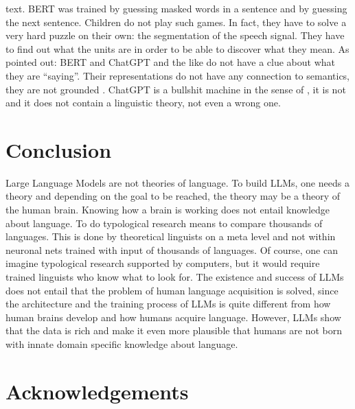 text. BERT was trained by guessing masked words in a sentence and by guessing the next
sentence. Children do not play such games. In fact, they have to solve a very hard puzzle on their own:
the segmentation of the speech signal. They have to find out what the units are in order to be able
to discover what they mean. 
%
As \citet{BK2020a} pointed
out: BERT and ChatGPT and the like do not have a clue about what they are ``saying''. Their representations do not have any
connection to semantics, they are not grounded \citep{BeulsVanEcke2024a}. ChatGPT is a bullshit machine in the sense of
\citet{HicksHumphriesSlater2024a}, it is not and it does not contain a linguistic theory, not even a
wrong one.
%


\section{Conclusion}

Large Language Models are not theories of language. To build LLMs, one needs a theory and depending
on the goal to be reached, the theory may be a theory of the human brain. Knowing how a brain is
working does not entail knowledge about language. To do typological research means to compare
thousands of languages. This is done by theoretical linguists on a meta level and not within
neuronal nets trained with input of thousands of languages. Of course, one can imagine typological
research supported by computers, but it would require trained linguists who know what to look for.
The existence and success of LLMs does not entail
that the problem of human language acquisition is solved, since the architecture and the training
process of LLMs is quite different from how human brains develop and how humans acquire
language. However, LLMs show that the data is rich and make it even more plausible that humans are
not born with innate domain specific knowledge about language.

\section*{Acknowledgements}


